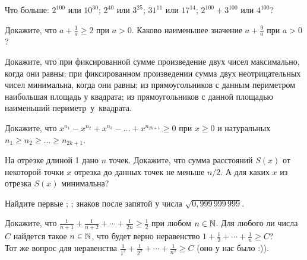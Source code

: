 \documentclass[a4paper,12pt]{article}
\begin{document}



 Что больше:
 $2^{100}$ или $10^{30}$;
 $2^{40}$ или $3^{25}$;
 $31^{11}$ или $17^{14}$;
 $2^{100}+3^{100}$ или $4^{100}$?

 Докажите, что %
$\displaystyle{a+\frac1a\ge 2}$ при $a>0$.
 Каково наименьшее значение %
$\displaystyle{a+\frac9a}$ при $a>0$?

Докажите, что
 при фиксированной сумме произведение двух чисел максимально, когда они равны;
 при фиксированном произведении сумма двух неотрицательных чисел минимальна, когда они равны;
 из прямоугольников с данным периметром наибольшая площадь у квадрата;
 из прямоугольников с данной площадью наименьший периметр~у~квадрата.


Докажите, что $x^{n_1}-x^{n_2}+x^{n_3}-\ldots +x^{n_{2k+1}}\ge 0$ при $x\ge0$ и натуральных %
$n_1\ge n_2\ge\ldots \ge n_{2k+1}$. %


На отрезке длиной 1 дано $n$ точек.  Докажите, что сумма расстояний $S(x)$ от некоторой точки $x$ отрезка до данных точек не меньше $n/2$.
 А для каких $x$ из отрезка $S(x)$ минимальна?


 Найдите первые
;
;
 знаков после запятой у числа $\sqrt{0,999\,999\,999}$.

 Докажите, что $\frac1{n+1}+\frac1{n+2}+\cdots +\frac1{2n}\ge\frac12$
при любом $n\in\mathbb{N}$.
  Для любого ли числа $C$ найдется
такое $n\in\mathbb{N}$, что будет верно
неравенство $1+\frac12+\cdots+\frac1n\ge C$?\\
 Тот же вопрос для неравенства $\frac1{1^2}+
\frac1{2^2}+\cdots +\frac1{n^2}\ge C$ (оно у нас было :)).
\end{document}
